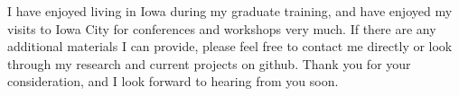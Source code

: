 \documentclass[11pt,letterpaper,sans,unicode]{moderncv}        %
\begin{document}




I have enjoyed living in Iowa during my graduate training, and have enjoyed my visits to Iowa City for conferences and workshops very much. If there are any additional materials I can provide, please feel free to contact me directly or look through my research and current projects on github. Thank you for your consideration, and I look forward to hearing from you soon.

\vspace{1cm}
\makeletterclosing

\end{document}

